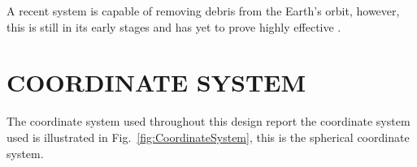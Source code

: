 \documentclass[11pt]{witseiepaper}
\begin{document}
\begin{bibunit}[witseie]
A recent system is capable of removing debris from the Earth's orbit, however, this is still in its early stages and has yet to prove highly effective \cite{removalSpaceDebris}.

\section{COORDINATE SYSTEM} \label{sec:CoordinateSystem}
The coordinate system used throughout this design report the coordinate system used is illustrated in Fig.~\ref{fig:CoordinateSystem}, this is the spherical coordinate system.
\begin{figure}
    \centering



\end{figure}
\end{bibunit}
\end{document}
